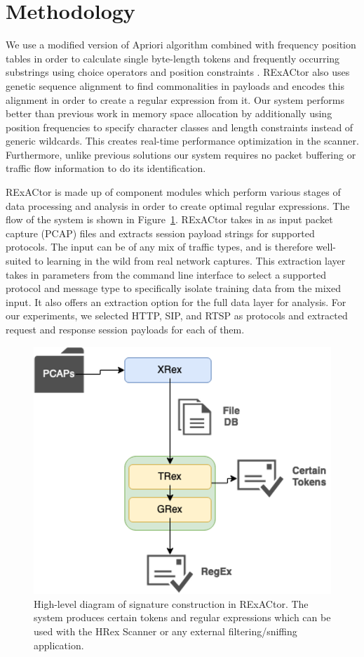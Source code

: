 \section{Methodology}
We use a modified version of Apriori algorithm combined with frequency position tables in order to calculate single byte-length tokens and frequently occurring substrings using choice operators and position constraints \cite{WANG2012992}. RExACtor also uses genetic sequence alignment to find commonalities in payloads and encodes this alignment in order to create a regular expression from it. Our system performs better than previous work in memory space allocation by additionally using position frequencies to specify character classes and length constraints instead of generic wildcards. This creates real-time performance optimization in the scanner. Furthermore, unlike previous solutions our system requires no packet buffering or traffic flow information to do its identification.

RExACtor is made up of component modules which perform various stages of data processing and analysis in order to create optimal regular expressions. The flow of the system is shown in Figure~\ref{f:diagram}. RExACtor takes in as input packet capture (PCAP) files and extracts session payload strings for supported protocols. The input can be of any mix of traffic types, and is therefore well-suited to learning in the wild from real network captures. This extraction layer takes in parameters from the command line interface to select a supported protocol and message type to specifically isolate training data from the mixed input. It also offers an extraction option for the full data layer for analysis. For our experiments, we selected HTTP, SIP, and RTSP as protocols and extracted request and response session payloads for each of them.

\begin{figure}[hbt!]
  \begin{center}
    \includegraphics[width=0.6\columnwidth]{chapters/3/img/diagram.png}
    \caption{High-level diagram of signature construction in RExACtor. The system produces certain tokens and regular expressions which can be used with the HRex Scanner or any external filtering/sniffing application.}
    \label{f:diagram}
  \end{center}
\end{figure}

